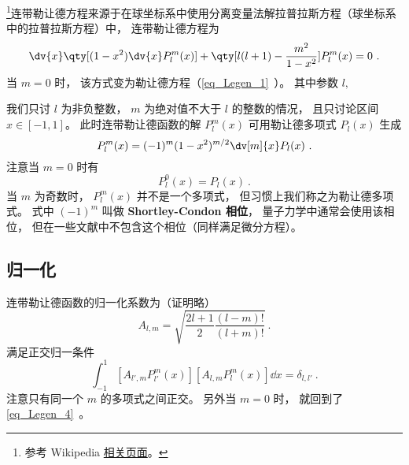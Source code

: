 

\footnote{参考 Wikipedia \href{https://en.wikipedia.org/wiki/Associated_Legendre_polynomials}{相关页面}。}连带勒让德方程来源于在球坐标系中使用分离变量法解拉普拉斯方程（球坐标系中的拉普拉斯方程）中， 连带勒让德方程为
\begin{equation}
\dv{x} \qty[(1-x^2)\dv{x} P_l^m(x)] + \qty[l(l+1) - \frac{m^2}{1-x^2}]P_l^m(x) = 0~.
\end{equation}
当 $m = 0$ 时， 该方式变为勒让德方程（\autoref{eq_Legen_1}~）。 其中参数 $l,$

我们只讨 $l$ 为非负整数， $m$ 为绝对值不大于 $l$ 的整数的情况， 且只讨论区间 $x\in [-1,1]$。 此时连带勒让德函数的解 $P_l^m(x)$ 可用勒让德多项式 $P_l(x)$ 生成
\begin{equation}\label{eq_AsLgdr_1}
P_l^m(x) = (-1)^m (1 - x^2)^{m/2} \dv[m]{x} P_l(x)~.
\end{equation}
注意当 $m = 0$ 时有
\begin{equation}
P_l^0(x) = P_l(x)~.
\end{equation}
当 $m$ 为奇数时， $P_l^m(x)$ 并不是一个多项式， 但习惯上我们称之为勒让德多项式。 式中 $(-1)^m$ 叫做 \textbf{Shortley-Condon 相位}， 量子力学中通常会使用该相位， 但在一些文献中不包含这个相位（同样满足微分方程）。

\subsection{归一化}
连带勒让德函数的归一化系数为（证明略）
\begin{equation}\label{eq_AsLgdr_3}
A_{l,m} = \sqrt{\frac{2l+1}{2}\frac{(l-m)!}{(l+m)!}}~.
\end{equation}
满足正交归一条件
\begin{equation}\label{eq_AsLgdr_4}
\int_{-1}^1 [A_{l',m} P_{l'}^{m}(x)] [A_{l,m} P_l^{m}(x)] \dd{x} = \delta_{l,l'}~.
\end{equation}
注意只有同一个 $m$ 的多项式之间正交。 另外当 $m = 0$ 时， 就回到了\autoref{eq_Legen_4}~。

